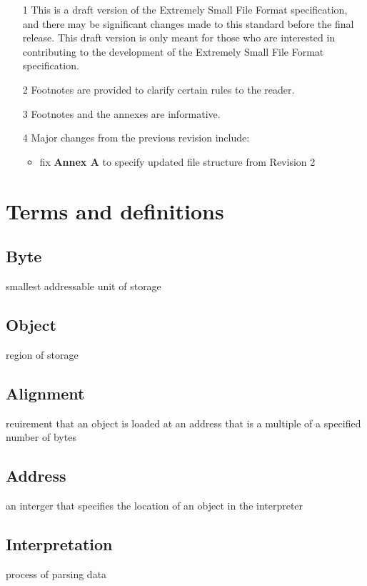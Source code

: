 \documentclass[a4paper]{article}
\begin{document}
    \begin{enumerate} %
        \item[1 ] This is a draft version of the Extremely Small File Format specification, and there may be significant changes made to this standard before the final release. This draft version is only meant for those who are interested in contributing to the development of the Extremely Small File Format specification.
        \item[2 ] Footnotes are provided to clarify certain rules to the reader.
        \item[3 ] Footnotes and the annexes are informative.
        \item[4 ] Major changes from the previous revision include:
            \begin{itemize}
                \item fix \textbf{Annex A} to specify updated file structure from Revision 2
            \end{itemize} 
    \end{enumerate}

    \section{Terms and definitions}

    \subsection{Byte}
    smallest addressable unit of storage

    \subsection{Object}
    region of storage

    \subsection{Alignment}
    reuirement that an object is loaded at an address that is a multiple of a specified number of bytes

    \subsection{Address}
    an interger that specifies the location of an object in the interpreter

    \subsection{Interpretation}
    process of parsing data
\end{document}
